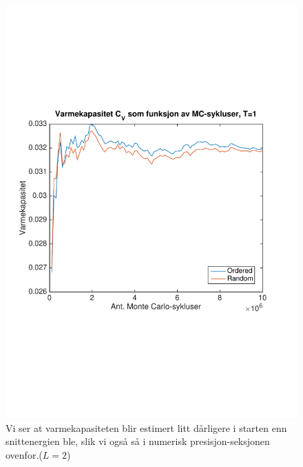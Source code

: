 \documentclass[norsk, 10pt]{article}
\begin{document}
\begin{figure}[H]
\centering
\includegraphics[scale = 0.5, trim = 1cm 8cm 1cm 8cm]{b_varmekap_MC_L2_T1.pdf}
\caption{Vi ser at varmekapasiteten blir estimert litt dårligere i starten enn snittenergien ble, slik vi også så i numerisk presisjon-seksjonen ovenfor.($L=2$)}
\label{fig:varmekapT1}
\end{figure}
\end{document}
